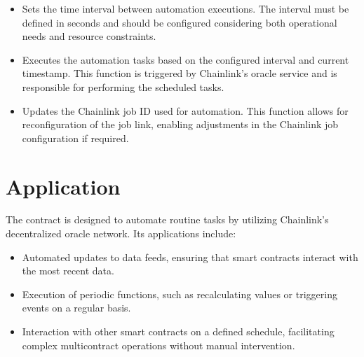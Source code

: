 \documentclass[letterpaper,10pt,english]{sphinxmanual}
\begin{document}
\sphinxAtStartPar
{}
\begin{itemize}
\item {} 
\sphinxAtStartPar
{}
\sphinxhyphen{} Sets the time interval between automation executions. The interval must be defined in seconds and should be configured considering both operational needs and resource constraints.

\item {} 
\sphinxAtStartPar
{}
\sphinxhyphen{} Executes the automation tasks based on the configured interval and current timestamp. This function is triggered by Chainlink’s oracle service and is responsible for performing the scheduled tasks.

\item {} 
\sphinxAtStartPar
{}
\sphinxhyphen{} Updates the Chainlink job ID used for automation. This function allows for reconfiguration of the job link, enabling adjustments in the Chainlink job configuration if required.

\end{itemize}


\section{Application}
\label{\detokenize{docs_chainlink_automation_contract:application}}
\sphinxAtStartPar
The  contract is designed to automate routine tasks by utilizing Chainlink’s decentralized oracle network. Its applications include:
\begin{itemize}
\item {} 
\sphinxAtStartPar
{} Automated updates to data feeds, ensuring that smart contracts interact with the most recent data.

\item {} 
\sphinxAtStartPar
{} Execution of periodic functions, such as recalculating values or triggering events on a regular basis.

\item {} 
\sphinxAtStartPar
{} Interaction with other smart contracts on a defined schedule, facilitating complex multi\sphinxhyphen{}contract operations without manual intervention.

\end{itemize}
\end{document}
